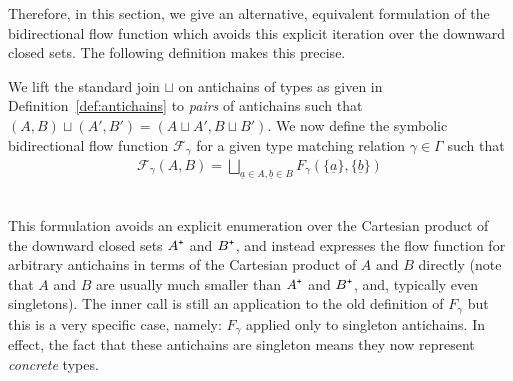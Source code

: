 \documentclass{sigplanconf}
\newcommand{\mc}[1]{\mathcal{#1}}
\newcommand{\mt}[1]{\text{\tt #1}}
\begin{document}
Therefore, in this section, we give an alternative, equivalent
formulation of the bidirectional flow function which avoids this
explicit iteration over the downward closed sets. The following
definition makes this precise.

\begin{definition}\label{def:efficient}
We lift the standard join $\sqcup$ on antichains of types as given in
Definition~\ref{def:antichains} to \emph{pairs} of antichains such
that $(A, B) \sqcup (A', B') = (A \sqcup A', B \sqcup B')$. We now
define the symbolic bidirectional flow function $\mc{F}_\gamma$ for a
given type matching relation $\gamma \in \Gamma$ such that
\begin{align*}
\mc{F}_\gamma(A, B) = \bigsqcup_{\underline{a} \in A, \underline{b} \in B}
F_\gamma(\{ \underline{a} \}, \{ \underline{b} \} )
\end{align*}
\ 
\end{definition}
This formulation avoids an explicit enumeration over the Cartesian
product of the downward closed sets $A^\mt{+}$ and $B^\mt{+}$, and
instead expresses the flow function for arbitrary antichains in terms
of the Cartesian product of $A$ and $B$ directly (note that $A$ and
$B$ are usually much smaller than $A^\mt{+}$ and $B^\mt{+}$, and,
typically even singletons). The inner call is still an application to
the old definition of $F_\gamma$ but this is a very specific case,
namely: $F_\gamma$ applied only to singleton antichains. In effect,
the fact that these antichains are singleton means they now represent
\emph{concrete} types.
\end{document}
